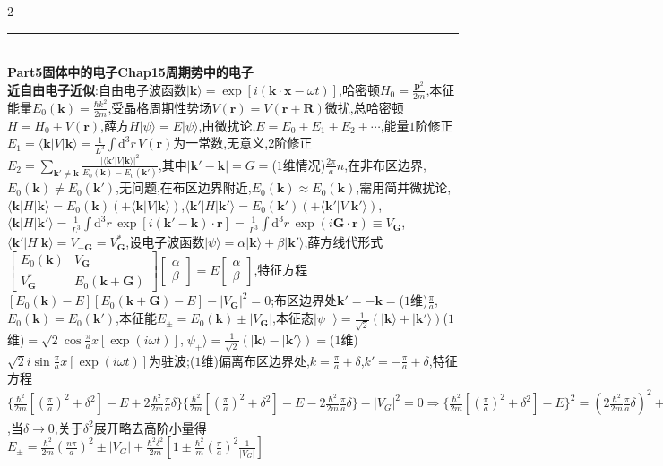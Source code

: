 \documentclass[UTF8,10pt,a4paper]{article}
\providecommand{\abs}[1]{\lvert#1\rvert}
\begin{document}
\begin{multicols}{2}
\rule{\columnwidth}{.2pt}\\
\textbf{Part5固体中的电子Chap15周期势中的电子}\\
\textbf{近自由电子近似}:自由电子波函数$\lvert\bm{k}\rangle=\exp[i(\bm{k}\cdot\bm{x}-\omega t)]$,哈密顿$H_0=\frac{\bm{p}^2}{2m}$,本征能量$E_0(\bm{k})=\frac{\hbar k^2}{2m}$,受晶格周期性势场$V(\bm{r})=V(\bm{r}+\bm{R})$微扰,总哈密顿$H=H_0+V(\bm{r})$,薛方$H\lvert\psi\rangle=E\lvert\psi\rangle$,由微扰论,$E=E_0+E_1+E_2+\cdots$,能量$1$阶修正$E_1=\langle\bm{k}\rvert V\lvert\bm{k}\rangle=\frac{1}{L^3}\int\mathrm{d}^3r\,V(\bm{r})$为一常数,无意义,$2$阶修正$E_2=\sum_{\bm{k}'\neq\bm{k}}\frac{\abs{\langle\bm{k}'\rvert V\lvert\bm{k}\rangle}^2}{E_0(\bm{k})-E_0(\bm{k}')}$,其中$\abs{\bm{k}'-\bm{k}}=G=$($1$维情况)$\frac{2\pi}{a}n$,在非布区边界,$E_0(\bm{k})\neq E_0(\bm{k}')$,无问题,在布区边界附近,$E_0(\bm{k})\approx E_0(\bm{k})$,需用简并微扰论,$\langle\bm{k}\rvert H\lvert\bm{k}\rangle=E_0(\bm{k})(+\langle\bm{k}\rvert V\lvert\bm{k}\rangle)$,$\langle\bm{k}'\rvert H\lvert\bm{k}'\rangle=E_0(\bm{k}')(+\langle\bm{k}'\rvert V\lvert\bm{k}'\rangle)$,$\langle\bm{k}\rvert H\lvert \bm{k}'\rangle=\frac{1}{L^3}\int\mathrm{d}^3r\,\exp[i(\bm{k}'-\bm{k})\cdot\bm{r}]=\frac{1}{L^3}\int\mathrm{d}^3r\,\exp(i\bm{G}\cdot\bm{r})\equiv V_{\bm{G}}$,$\langle\bm{k}'\rvert H\lvert\bm{k}\rangle=V_{-\bm{G}}=V_{\bm{G}}^*$,设电子波函数$\lvert\psi\rangle=\alpha\lvert\bm{k}\rangle+\beta\lvert\bm{k}'\rangle$,薛方线代形式$\left[\begin{smallmatrix}
    E_0(\bm{k})&V_{\bm{G}}\\
    V_{\bm{G}}^*&E_0(\bm{k}+\bm{G})
\end{smallmatrix}\right]\left[\begin{smallmatrix}
    \alpha\\
    \beta
\end{smallmatrix}\right]=E\left[\begin{smallmatrix}
    \alpha\\
    \beta
\end{smallmatrix}\right]$,特征方程$[E_0(\bm{k})-E][E_0(\bm{k}+\bm{G})-E]-\abs{V_{\bm{G}}}^2=0$;布区边界处$\bm{k}'=-\bm{k}=$($1$维)$\frac{\pi}{a}$,$E_0(\bm{k})=E_0(\bm{k}')$,本征能$E_{\pm}=E_0(\bm{k})\pm\abs{V_{\bm{G}}}$,本征态$\lvert\psi_-\rangle=\frac{1}{\sqrt{2}}(\lvert\bm{k}\rangle+\lvert\bm{k}'\rangle)$($1$维)$=\sqrt{2}\cos\frac{\pi}{a}x[\exp(i\omega t)]$,$\lvert\psi_+\rangle=\frac{1}{\sqrt{2}}(\lvert\bm{k}\rangle-\lvert\bm{k}'\rangle)=$($1$维)$\sqrt{2}i\sin\frac{\pi}{a}x[\exp(i\omega t)]$为驻波;($1$维)偏离布区边界处,$k=\frac{\pi}{a}+\delta$,$k'=-\frac{\pi}{a}+\delta$,特征方程$\{\frac{\hbar^2}{2m}[(\frac{\pi}{a})^2+\delta^2]-E+2\frac{\hbar^2}{2m}\frac{\pi}{a}\delta\}\{\frac{\hbar^2}{2m}[(\frac{\pi}{a})^2+\delta^2]-E-2\frac{\hbar^2}{2m}\frac{\pi}{a}\delta\}-\abs{V_G}^2=0\Rightarrow\{\frac{\hbar^2}{2m}[(\frac{\pi}{a})^2+\delta^2]-E\}^2=(2\frac{\hbar^2}{2m}\frac{\pi}{a}\delta)^2+\abs{V_G}^2\Rightarrow E_{\pm}=\frac{\hbar^2}{2m}[(\frac{\pi}{a})^2+\delta^2]\pm\sqrt{(2\frac{\hbar^2}{2m}\frac{\pi}{a}\delta)^2+\abs{V_G}^2}$,当$\delta\rightarrow 0$,关于$\delta^2$展开略去高阶小量得$E_{\pm}=\frac{\hbar^2}{2m}(\frac{n\pi}{a})^2\pm\abs{V_G}+\frac{\hbar^2\delta^2}{2m}[1\pm\frac{\hbar^2}{m}(\frac{\pi}{a})^2\frac{1}{\abs{V_G}}]$\\

\end{multicols}
\end{document}
